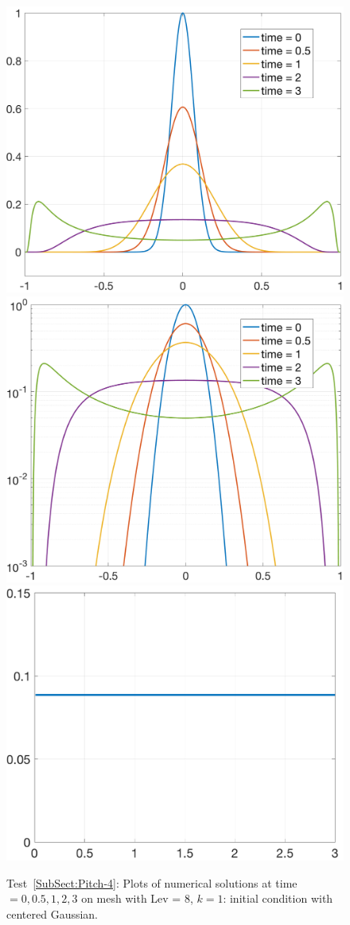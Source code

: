 \documentclass[preprint,11pt]{elsarticle}
\begin{document}
\begin{figure}[H]
\centering
\includegraphics[width=.32\textwidth]{./NumFig/Test4-3-1-L8D2}
\includegraphics[width=.32\textwidth]{./NumFig/Test4-3-1-L8D2-log}
\includegraphics[width=.32\textwidth]{./NumFig/Test4-3-k1-1-Con_v2}
\caption{Test~\ref{SubSect:Pitch-4}: Plots of numerical solutions at time $=0,0.5,1,2,3$ on mesh with Lev = 8, $k=1$: initial condition with centered Gaussian.}\label{Fig:Pitch-3-1}
\end{figure}
\end{document}
